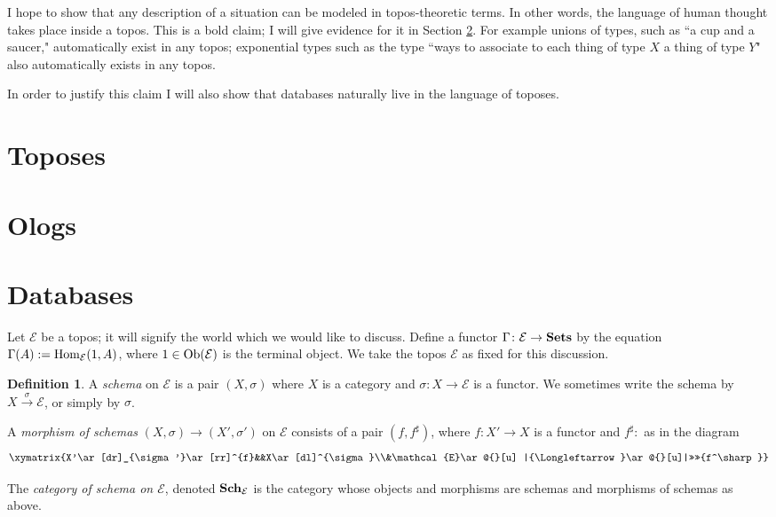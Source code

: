 \documentclass{amsart}
\makeatletter
\def\tn{\textnormal}
\def\mc{\mathcal}
\def\Hom{\tn{Hom}}
\def\Ob{\tn{Ob}}
\def\to{\rightarrow}
\def\taking{\colon}
\newcommand{\To}[1]{\xrightarrow{#1}}
\newcommand{\TriLeft}[7]{\xymatrix{#1\ar[dr]_{#2}\ar[rr]^{#3}&&#4\ar[dl]^{#5}\\&#6\ar@{}[u] |{\Longleftarrow}\ar@{}[u]|>>>>{#7}}}
\def\Sets{{\bf Sets}}
\def\mcE{\mc{E}}
\theoremstyle{remark}
\theoremstyle{definition}
\newtheorem{definition}[theorem]{Definition}
\def\Sch{{\bf Sch}}
\makeatother
\begin{document}
I hope to show that any description of a situation can be modeled in topos-theoretic terms.  In other words, the language of human thought takes place inside a topos.  This is a bold claim; I will give evidence for it in Section \ref{sec:ologs}.  For example unions of types, such as ``a cup and a saucer," automatically exist in any topos; exponential types such as the type ``ways to associate to each thing of type $X$ a thing of type $Y$" also automatically exists in any topos.

In order to justify this claim I will also show that databases naturally live in the language of toposes.


\section{Toposes}\label{sec:toposes}



\section{Ologs}\label{sec:ologs}

\section{Databases}

Let $\mcE$ be a topos; it will signify the world which we would like to discuss.  Define a functor $\Gamma\taking\mcE\to\Sets$ by the equation $\Gamma(A):=\Hom_\mcE(1,A)$, where $1\in\Ob(\mcE)$ is the terminal object.  We take the topos $\mcE$ as fixed for this discussion.  

\begin{definition}

A {\em schema} on $\mcE$ is a pair $(X,\sigma)$ where $X$ is a category and $\sigma\taking X\to\mcE$ is a functor.  We sometimes write the schema by $X\To{\sigma}\mcE$, or simply by $\sigma$.

A {\em morphism of schemas} $(X,\sigma)\to(X',\sigma')$ on $\mcE$ consists of a pair $(f,f^\sharp)$, where $f\taking X'\to X$ is a functor and $f^\sharp\taking$ as in the diagram $$\TriLeft{X'}{\sigma'}{f}{X}{\sigma}{\mcE}{f^\sharp}$$

The {\em category of schema on $\mcE$}, denoted $\Sch_\mcE$ is the category whose objects and morphisms are schemas and morphisms of schemas as above.

\end{definition}
\end{document}

